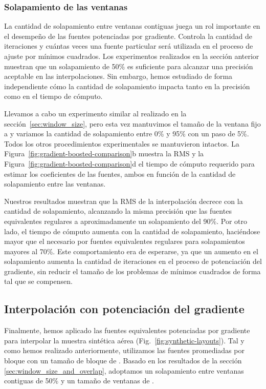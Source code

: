 \subsubsection{Solapamiento de las ventanas}

La cantidad de solapamiento entre ventanas contiguas juega un rol importante en
el desempeño de las fuentes potenciadas por gradiente.
Controla la cantidad de iteraciones y cuántas veces una fuente particular será
utilizada en el proceso de ajuste por mínimos cuadrados.
Los experimentos realizados en la sección anterior muestran que un solapamiento
de 50\% es suficiente para alcanzar una precisión aceptable en las
interpolaciones.
Sin embargo, hemos estudiado de forma independiente cómo la cantidad de
solapamiento impacta tanto en la precisión como en el tiempo de cómputo.

Llevamos a cabo un experimento similar al realizado en la
sección~\ref{sec:window_size}, pero esta vez mantuvimos el tamaño de la ventana
fijo a \BoostOverlappingWindowSize{} y variamos la cantidad de solapamiento
entre 0\% y 95\% con un paso de 5\%.
Todos los otros procedimientos experimentales se mantuvieron intactos.
La Figura~\ref{fig:gradient-boosted-comparison}b
muestra la \ac{RMS} y la
Figura~\ref{fig:gradient-boosted-comparison}d
el tiempo de cómputo requerido para estimar los coeficientes de las fuentes,
ambos en función de la cantidad de solapamiento entre las ventanas.

Nuestros resultados muestran que la \ac{RMS} de la interpolación decrece con la
cantidad de solapamiento, alcanzando la misma precisión que las fuentes
equivalentes regulares a aproximadamente un solapamiento del 90\%.
Por otro lado, el tiempo de cómputo aumenta con la cantidad de solapamiento,
haciéndose mayor que el necesario por fuentes equivalentes regulares para
solapamientos mayores al 70\%.
Este comportamiento era de esperarse, ya que un aumento en el solapamiento
aumenta la cantidad de iteraciones en el proceso de potenciación del gradiente,
sin reducir el tamaño de los problemas de mínimos cuadrados de forma tal que se
compensen.


\subsection{
    Interpolación con potenciación del gradiente
}
\label{sec:gb_interpolation}

Finalmente, hemos aplicado las fuentes equivalentes potenciadas por gradiente
para interpolar la muestra sintética aérea (Fig.~\ref{fig:synthetic-layouts}).
Tal y como hemos realizado anteriormente, utilizamos las fuentes promediadas
por bloque con un tamaño de bloque de \EqlBoostAirborneSpacing{}.
Basado en los resultados de la sección \ref{sec:window_size_and_overlap},
adoptamos un solapamiento entre ventanas contiguas de 50\% y un tamaño de
ventanas de \EqlBoostAirborneWindowSize{}.

